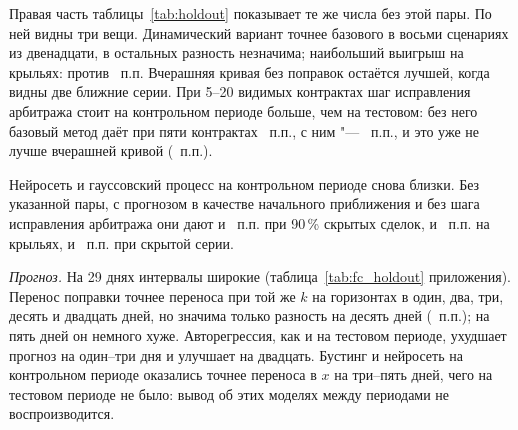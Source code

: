 \documentclass{article}
\begin{document}
Правая часть таблицы~\ref{tab:holdout} показывает те же числа без этой пары. По ней видны три вещи. Динамический вариант точнее базового в восьми сценариях из двенадцати, в остальных разность незначима; наибольший выигрыш на крыльях:  против ~п.п. Вчерашняя кривая без поправок остаётся лучшей, когда видны две ближние серии. При 5--20 видимых контрактах шаг исправления арбитража стоит на контрольном периоде больше, чем на тестовом: без него базовый метод даёт при пяти контрактах ~п.п., с ним "--- ~п.п., и это уже не лучше вчерашней кривой (~п.п.).

Нейросеть и гауссовский процесс на контрольном периоде снова близки. Без указанной пары, с прогнозом в качестве начального приближения и без шага исправления арбитража они дают  и ~п.п. при 90\,\% скрытых сделок,  и ~п.п. на крыльях,  и ~п.п. при скрытой серии.

\emph{Прогноз.} На 29 днях интервалы широкие (таблица~\ref{tab:fc_holdout} приложения). Перенос поправки точнее переноса при той же $k$ на горизонтах в один, два, три, десять и двадцать дней, но значима только разность на десять дней (~п.п.); на пять дней он немного хуже. Авторегрессия, как и на тестовом периоде, ухудшает прогноз на один--три дня и улучшает на двадцать. Бустинг и нейросеть на контрольном периоде оказались точнее переноса в $x$ на три--пять дней, чего на тестовом периоде не было: вывод об этих моделях между периодами не воспроизводится.
\end{document}
